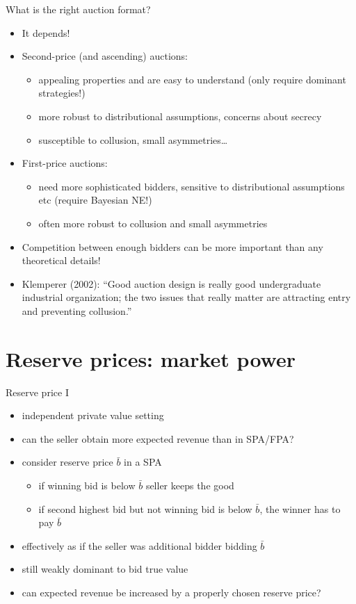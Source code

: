 \documentclass[bigger]{beamer}
\begin{document}
\begin{frame}[label={sec:orgb6a796d}]{What is the right auction format?}
\begin{itemize}
\item It depends!
\item Second-price (and ascending) auctions:
\begin{itemize}
\item appealing properties and are easy to understand (only require dominant strategies!)
\item more robust to distributional assumptions, concerns about secrecy
\item susceptible to collusion, small asymmetries\ldots{}
\end{itemize}
\item First-price auctions:
\begin{itemize}
\item need more sophisticated bidders, sensitive to distributional assumptions etc (require Bayesian NE!)
\item often more robust to collusion and small asymmetries
\end{itemize}
\item Competition between enough bidders can be more important than any theoretical details!
\item Klemperer (2002): “Good auction design is really good undergraduate industrial organization; the two issues that really matter are attracting entry and preventing collusion.”
\end{itemize}
\end{frame}

\section{Reserve prices: market power}
\label{sec:orge09caf0}
\begin{frame}[label={sec:org13c0110}]{Reserve price I}
\begin{itemize}
\item independent private value setting
\item can the seller obtain more expected revenue than in SPA/FPA?
\item consider reserve price \(\bar b\) in a SPA
\begin{itemize}
\item if winning bid is below \(\bar b\) seller keeps the good
\item if second highest bid but not winning bid is below \(\bar b\), the winner has to pay \(\bar b\)
\end{itemize}
\item effectively as if the seller was additional bidder bidding \(\bar b\)
\item still weakly dominant to bid true value
\item can expected revenue be increased by a properly chosen reserve price?
\end{itemize}
\end{frame}
\end{document}
